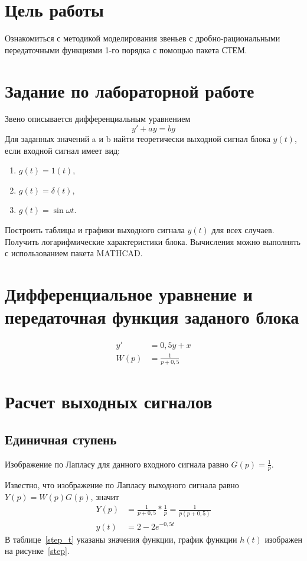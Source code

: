 \newpage
\section{Цель работы}
Ознакомиться с методикой моделирования звеньев с дробно-рациональными передаточными функциями 1-го порядка с помощью пакета СТЕМ.

\section{Задание по лабораторной работе}
Звено описывается дифференциальным уравнением
$$
	y'+ay=bg
$$
Для заданных значений a и b найти теоретически выходной сигнал блока $y(t)$, если входной сигнал имеет вид:
\begin{enumerate}
	\item $g(t) = 1(t)$,
	\item $g(t) = \delta(t)$,
	\item $g(t) = \sin\omega{}t$.
\end{enumerate}
Построить таблицы и графики выходного сигнала $y(t)$ для всех случаев. Получить логарифмические характеристики блока. Вычисления можно выполнять с использованием пакета MATHCAD.

\section{Дифференциальное уравнение и передаточная функция заданого блока}
\begin{align*}
	y'&=0{,}5y+x\\
	W(p)&=\frac1{p+0{,}5}
\end{align*}

\section{Расчет выходных сигналов}
\subsection{Единичная ступень}
Изображение по Лапласу для данного входного сигнала равно $G(p)=\frac1p$.

Известно, что изображение по Лапласу выходного сигнала равно $Y(p)=W(p)G(p)$, значит
\begin{align*}
	Y(p)&=\frac1{p+0{,}5}*\frac1p=\frac1{p(p+0{,}5)}\\
	y(t)&=2-2e^{-0{,}5t}
\end{align*}
В таблице~\ref{step_t} указаны значения функции, график функции $h(t)$ изображен на рисунке~\ref{step}.

